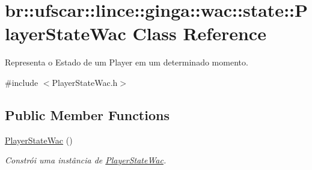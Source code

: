 \hypertarget{classbr_1_1ufscar_1_1lince_1_1ginga_1_1wac_1_1state_1_1PlayerStateWac}{
\section{br::ufscar::lince::ginga::wac::state::PlayerStateWac Class Reference}
\label{classbr_1_1ufscar_1_1lince_1_1ginga_1_1wac_1_1state_1_1PlayerStateWac}
}


Representa o Estado de um Player em um determinado momento.  


{\ttfamily \#include $<$PlayerStateWac.h$>$}\subsection*{Public Member Functions}
\begin{DoxyCompactItemize}
\item 
\hypertarget{classbr_1_1ufscar_1_1lince_1_1ginga_1_1wac_1_1state_1_1PlayerStateWac_aa4757cabc74e55dc316743bba409406c}{
\hyperlink{classbr_1_1ufscar_1_1lince_1_1ginga_1_1wac_1_1state_1_1PlayerStateWac_aa4757cabc74e55dc316743bba409406c}{PlayerStateWac} ()}
\label{classbr_1_1ufscar_1_1lince_1_1ginga_1_1wac_1_1state_1_1PlayerStateWac_aa4757cabc74e55dc316743bba409406c}

\begin{DoxyCompactList}\small\item\em Constrói uma instância de \hyperlink{classbr_1_1ufscar_1_1lince_1_1ginga_1_1wac_1_1state_1_1PlayerStateWac}{PlayerStateWac}. \item\end{DoxyCompactList}\end{DoxyCompactItemize}
